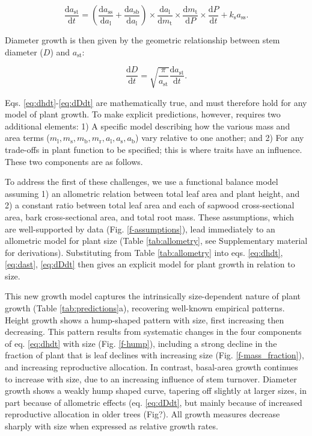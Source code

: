 \documentclass[12pt, a4paper]{article}
\begin{document}
\begin{equation}\label{eq:dast}
\frac{\textrm{d}a_\textrm{st}}{\textrm{d}t}=
\left(\frac{\textrm{d}a_\textrm{ss}}{\textrm{d}a_\textrm{l}} + \frac{\textrm{d}a_\textrm{sb}}{\textrm{d}a_\textrm{l}}\right) \times
\frac{\textrm{d}a_\textrm{l}}{\textrm{d}m_\textrm{t}} \times \frac{\textrm{d}m_\textrm{t}}{\textrm{d}P} \times \frac{\textrm{d}P}{\textrm{d}t} + k_\textrm{s} a_\textrm{ss}.
\end{equation}

Diameter growth is then given by the geometric relationship between stem
diameter (\(D\)) and \(a_\textrm{st}\):

\begin{equation} \label{eq:dDdt}
\frac{\textrm{d}D}{\textrm{d}t}= \sqrt{\frac{\pi}{a_\textrm{st}}} \frac{\textrm{d}a_\textrm{st}}{\textrm{d}t}.
\end{equation}

Eqs. \ref{eq:dhdt}-\ref{eq:dDdt} are mathematically true, and must
therefore hold for any model of plant growth. To make explicit
predictions, however, requires two additional elements: 1) A specific
model describing how the various mass and area terms
(\(m_\textrm{l}, m_\textrm{s}, m_\textrm{b}, m_\textrm{r}, a_\textrm{l}, a_\textrm{s}, a_\textrm{b}\))
vary relative to one another; and 2) For any trade-offs in plant
function to be specified; this is where traits have an influence. These
two components are as follows.

To address the first of these challenges, we use a functional balance
model\citep{yokozawa-1995,falster-2011} assuming
1) an allometric relation between total leaf area and plant height, and
2) a constant ratio between total leaf area and each of sapwood
cross-sectional area, bark cross-sectional area, and total root mass.
These assumptions, which are well-supported by data (Fig.
\ref{f-assumptions}), lead immediately to an allometric model for plant
size (Table \ref{tab:allometry}, see Supplementary material for
derivations). Substituting from Table \ref{tab:allometry} into eqs.
\ref{eq:dhdt}, \ref{eq:dast}, \ref{eq:dDdt} then gives an explicit model
for plant growth in relation to size.

This new growth model captures the intrinsically size-dependent nature
of plant growth (Table \ref{tab:predictions}a), recovering well-known
empirical patterns\citep{sillett-2010, king-2011}. Height growth shows a hump-shaped pattern
with size, first increasing then decreasing. This pattern results from
systematic changes in the four components of eq. \ref{eq:dhdt} with size
(Fig. \ref{f-hump}), including a strong decline in the fraction of plant
that is leaf declines with increasing size (Fig. \ref{f-mass_fraction}),
and increasing reproductive allocation. In contrast, basal-area growth
continues to increase with size\citep{sillett-2010,
@stephenson-2014}, due to an increasing influence of stem
turnover. Diameter growth shows a weakly hump shaped
curve\citep{herault-2011}, tapering off slightly at larger
sizes, in part because of allometric effects (eq. \ref{eq:dDdt}, but
mainly because of increased reproductive allocation in older trees
(Fig?). All growth measures decrease sharply with size when expressed as
relative growth rates\citep{iida-2014}.
\end{document}
